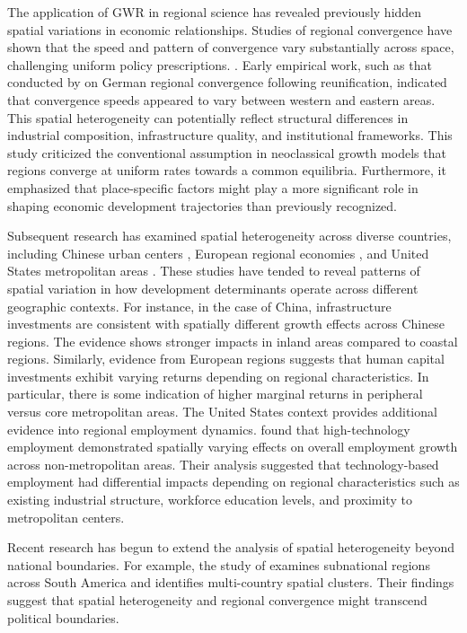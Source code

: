 \documentclass[smallextended, natbib]{svjour3}       %
\begin{document}
The application of GWR in regional science has revealed previously hidden spatial variations in economic relationships. 
Studies of regional convergence have shown that the speed and pattern of convergence vary substantially across space, challenging uniform policy prescriptions. .
Early empirical work, such as that conducted by \citet{eckey2006regional} on German regional convergence following reunification, indicated that convergence speeds appeared to vary between western and eastern areas. 
This spatial heterogeneity can potentially reflect structural differences in industrial composition, infrastructure quality, and institutional frameworks. 
This study criticized the conventional assumption in neoclassical growth models that regions converge at uniform rates towards a common equilibria.
Furthermore, it emphasized that place-specific factors might play a more significant role in shaping economic development trajectories than previously recognized.

Subsequent research has examined spatial heterogeneity across diverse countries, including Chinese urban centers \citep{li2007study}, European regional economies \citep{thissen2016competitive}, and United States metropolitan areas \citep{partridge2007geographic}. 
These studies have tended to reveal patterns of spatial variation in how development determinants operate across different geographic contexts.
For instance, in the case of China,  infrastructure investments are consistent with spatially different growth effects across Chinese regions. 
The evidence shows stronger impacts in inland areas compared to coastal regions. 
Similarly, evidence from European regions suggests that human capital investments exhibit varying returns depending on regional characteristics.
In particular, there is some indication of higher marginal returns in peripheral versus core metropolitan areas.
The United States context provides additional evidence into regional employment dynamics. 
\citet{partridge2007geographic} found that high-technology employment demonstrated spatially varying effects on overall employment growth across non-metropolitan areas. 
Their analysis suggested that technology-based employment had differential impacts depending on regional characteristics such as existing industrial structure, workforce education levels, and proximity to metropolitan centers. 

Recent research has begun to extend the analysis of spatial heterogeneity beyond national boundaries.
For example, the study of \citet{Mendez2022} examines subnational regions across South America and identifies multi-country spatial clusters. 
Their findings suggest that spatial heterogeneity and regional convergence might transcend political boundaries.  
\end{document}
